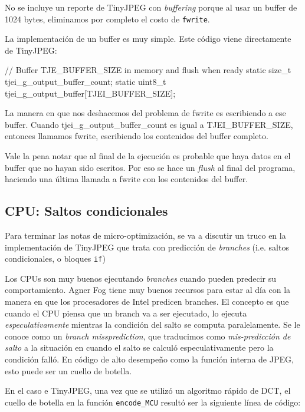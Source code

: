 {No se incluye un reporte de TinyJPEG con \emph{buffering} porque al usar un
buffer de 1024 bytes, eliminamos por completo el costo de \verb+fwrite+.

La implementación de un buffer es muy simple. Este código viene directamente de TinyJPEG:

\begin{code}[language=C][h]
    // Buffer TJE_BUFFER_SIZE in memory and flush when ready
    static size_t tjei_g_output_buffer_count;
    static uint8_t tjei_g_output_buffer[TJEI_BUFFER_SIZE];
\end{code}

La manera en que nos deshacemos del problema de fwrite es escribiendo a ese
buffer.  Cuando tjei\_g\_output\_buffer\_count es igual a TJEI\_BUFFER\_SIZE,
entonces llamamos fwrite, escribiendo los contenidos del buffer completo.

Vale la pena notar que al final de la ejecución es probable que haya datos en
el buffer que no hayan sido escritos. Por eso se hace un \emph{flush} al final
del programa, haciendo una última llamada a fwrite con los contenidos del
buffer.

\subsection{CPU: Saltos condicionales}\label{sub:cpu-branch}

Para terminar las notas de micro-optimización, se va a discutir un truco en la
implementación de TinyJPEG que trata con predicción de \emph{branches} (i.e.
saltos condicionales, o bloques \verb+if+)

Los CPUs son muy buenos ejecutando \emph{branches} cuando pueden predecir su
comportamiento. Agner Fog \cite{agner} tiene muy buenos recursos para estar al
día con la manera en que los procesadores de Intel predicen branches. El
concepto es que cuando el CPU piensa que un branch va a ser ejecutado, lo
ejecuta \emph{ especulativamente } mientras la condición del salto se computa
paralelamente. Se le conoce como un \emph{branch missprediction}, que
traducimos como \emph{mis-predicción de salto} a la situación en cuando el
salto se calculó especulativamente pero la condición falló. En código de alto
desempeño como la función interna de JPEG, esto puede ser un cuello de botella.

En el caso e TinyJPEG, una vez que se utilizó un algoritmo rápido de DCT, el
cuello de botella en la función \verb+encode_MCU+ resultó ser la siguiente
línea de código:

}
